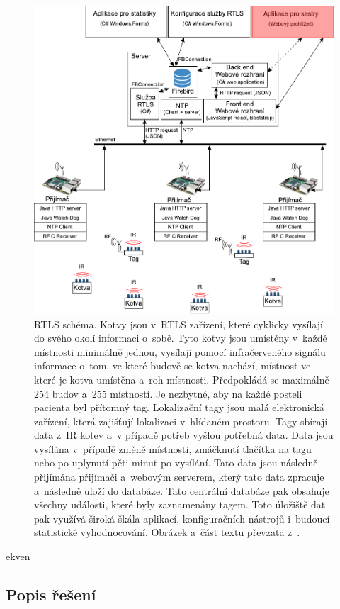 \begin{figure} [H]
	\centering
	\includegraphics[width=15cm]{../RTLS.pdf}
	\caption{RTLS schéma. Kotvy jsou v~RTLS zařízení, které cyklicky vysílají do svého okolí informaci o~sobě. Tyto kotvy jsou umístěny v~každé místnosti minimálně jednou, vysílají pomocí infračerveného signálu informace o~tom, ve které budově se kotva nachází, místnost ve které je kotva umístěna a~roh místnosti. Předpokládá se maximálně 254 budov a~255 místností. Je nezbytné, aby na každé posteli pacienta byl přítomný tag. Lokalizační tagy jsou malá elektronická zařízení, která zajišťují lokalizaci v~hlídaném prostoru. Tagy sbírají data z~IR kotev a~v případě potřeb vyšlou potřebná data. Data jsou vysílána v~případě změně místnosti, zmáčknutí tlačítka na tagu nebo po uplynutí pěti minut po vysílání. Tato data jsou následně přijímána přijímači a~webovým serverem, který tato data zpracuje a~následně uloží do databáze. Tato centrální databáze pak obsahuje všechny události, které byly zaznamenány tagem. Toto úložiště dat pak využívá široká škála aplikací, konfiguračních nástrojů i~budoucí statistické vyhodnocování. Obrázek a~část textu převzata z~\cite{RTLS}.}
	\label{fig:RTLS}
\end{figure}
ekven
\subsection{Popis řešení}


